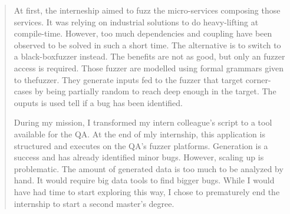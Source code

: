 \documentclass[
  11pt,
  english,
  paper=a4,
,captions=tableheading
]{scrartcl}
\begin{document}
{\begin{quotation}
At first, the interneship aimed to fuzz the micro-services composing those services. It was relying on industrial solutions \cite{AFLplusplus-Woot20} to do heavy-lifting at compile-time. However, too much dependencies and coupling have been observed to be solved in such a short time. The alternative is to switch to a black-boxfuzzer instead. The benefits are not as good, but only an fuzzer access is required. Those fuzzer are modelled using formal grammars given to thefuzzer. They generate inputs fed to the fuzzer that target corner-cases by being partially random to reach deep enough in the target. The ouputs is used tell if a bug has been identified.

During my mission, I transformed my intern colleague's script to a tool available for the QA. At the end of mly internship, this application is structured and executes on the QA's fuzzer platforms. Generation is a success and has already identified minor bugs. However, scaling up is problematic. The amount of generated data is too much to be analyzed by hand. It would require big data tools to find bigger bugs. While I would have had time to start exploring this way, I chose to prematurely end the internship to start a second master's degree.
\end{quotation}
}

\vfil
\end{document}

